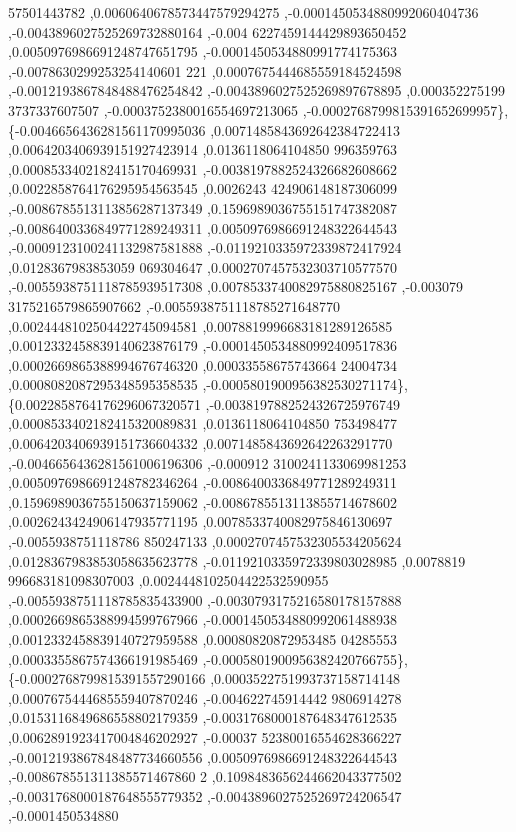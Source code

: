 \begin{DoxyCode}
      57501443782 ,0.0060640678573447579294275 ,-0.0001450534880992060404736 ,-0.0043896027525269732880164 ,-0.004
      6227459144429893650452 ,0.0050976986691248747651795 ,-0.0001450534880991774175363 ,-0.0078630299253254140601
      221 ,0.0007675444685559184524598 ,-0.0012193867848488476254842 ,-0.0043896027525269897678895 ,0.000352275199
      3737337607507 ,-0.0003752380016554697213065 ,-0.0002768799815391652699957\},
\{-0.0046656436281561170995036 ,0.0071485843692642384722413 ,0.0064203406939151927423914 ,0.0136118064104850
      996359763 ,0.0008533402182415170469931 ,-0.0038197882524326682608662 ,0.0022858764176295954563545 ,0.0026243
      424906148187306099 ,-0.0086785513113856287137349 ,0.1596989036755151747382087 ,-0.0086400336849771289249311 
      ,0.0050976986691248322644543 ,-0.0009123100241132987581888 ,-0.0119210335972339872417924 ,0.0128367983853059
      069304647 ,0.0002707457532303710577570 ,-0.0055938751118785939517308 ,0.0078533740082975880825167 ,-0.003079
      3175216579865907662 ,-0.0055938751118785271648770 ,0.0024448102504422745094581 ,0.0078819996683181289126585 
      ,0.0012332458839140623876179 ,-0.0001450534880992409517836 ,0.0002669865388994676746320 ,0.00033558675743664
      24004734 ,0.0008082087295348595358535 ,-0.0005801900956382530271174\},
\{0.0022858764176296067320571 ,-0.0038197882524326725976749 ,0.0008533402182415320089831 ,0.0136118064104850
      753498477 ,0.0064203406939151736604332 ,0.0071485843692642263291770 ,-0.0046656436281561006196306 ,-0.000912
      3100241133069981253 ,0.0050976986691248782346264 ,-0.0086400336849771289249311 ,0.1596989036755150637159062 
      ,-0.0086785513113855714678602 ,0.0026243424906147935771195 ,0.0078533740082975846130697 ,-0.0055938751118786
      850247133 ,0.0002707457532305534205624 ,0.0128367983853058635623778 ,-0.0119210335972339803028985 ,0.0078819
      996683181098307003 ,0.0024448102504422532590955 ,-0.0055938751118785835433900 ,-0.0030793175216580178157888 
      ,0.0002669865388994599767966 ,-0.0001450534880992061488938 ,0.0012332458839140727959588 ,0.00080820872953485
      04285553 ,0.0003355867574366191985469 ,-0.0005801900956382420766755\},
\{-0.0002768799815391557290166 ,0.0003522751993737158714148 ,0.0007675444685559407870246 ,-0.004622745914442
      9806914278 ,0.0153116849686558802179359 ,-0.0031768000187648347612535 ,0.0062891923417004846202927 ,-0.00037
      52380016554628366227 ,-0.0012193867848487734660556 ,0.0050976986691248322644543 ,-0.008678551311385571467860
      2 ,0.1098483656244662043377502 ,-0.0031768000187648555779352 ,-0.0043896027525269724206547 ,-0.0001450534880

\end{DoxyCode}
